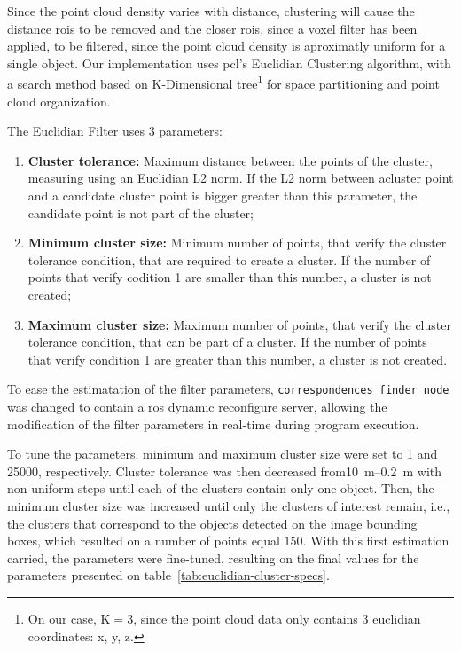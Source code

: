 Since the point cloud density varies with distance, clustering will cause the distance \acp{roi} to be removed and the closer \acp{roi}, since a voxel filter has been applied, to be filtered, since the point cloud density is aproximatly uniform for a single object. Our implementation uses \ac{pcl}'s Euclidian Clustering algorithm, with a search method based on K-Dimensional tree\footnote{On our case, K$=3$, since the point cloud data only contains 3 euclidian coordinates: x, y, z.} for space partitioning and point cloud organization.

The Euclidian Filter uses 3 parameters:

\begin{enumerate}
	\item \textbf{Cluster tolerance:} Maximum distance between the points of the cluster, measuring using an Euclidian L2 norm. If the L2 norm between acluster point and a candidate cluster point is bigger greater than this parameter, the candidate point is not part of the cluster;
	\item \textbf{Minimum cluster size:} Minimum number of points, that verify the cluster tolerance condition, that are required to create a cluster. If the number of points that verify codition 1 are smaller than this number, a cluster is not created;
	\item \textbf{Maximum cluster size:} Maximum number of points, that verify the cluster tolerance condition, that can be part of a cluster. If the number of points that verify condition 1 are greater than this number, a cluster is not created.
\end{enumerate}

To ease the estimatation of the filter parameters, \texttt{correspondences\_finder\_node} was changed to contain a \ac{ros} dynamic reconfigure server, allowing the modification of the filter parameters in real-time during program execution. 

To tune the parameters, minimum and maximum cluster size were set to 1 and 25000, respectively. Cluster tolerance was then decreased from\SIrange{10}{0.2}{\meter} with non-uniform steps until each of the clusters contain only one object. Then, the minimum cluster size was increased until only the clusters of interest remain, i.e., the clusters that correspond to the objects detected on the image bounding boxes, which resulted on a number of points equal $150$. With this first estimation carried, the parameters were fine-tuned, resulting on the final values for the parameters presented on table~\ref{tab:euclidian-cluster-specs}.

